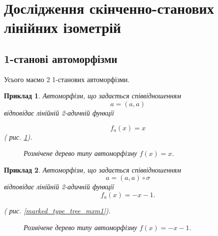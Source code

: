 \documentclass[a4paper,12pt]{article} \usepackage{a4wide}
\numberwithin{equation}{subsection}
\newtheorem{example}{Приклад}[subsection]
\begin{document}
 \newpage
\section{Дослідження скінченно-станових лінійних ізометрій}
\subsection{1-станові автоморфізми}
Усього маємо 2 1-станових автоморфізми.
\begin{example}
Автоморфізм, що задається співвідношенням
$$a = (a,a)$$
відповідає лінійній 2-адичній функції

$$f_a(x) = x $$
( рис. \ref{marked_type_tree_x}).
\begin{figure}[h!]
\caption{Розмічене дерево типу автоморфізму $f(x)= x$.}
\label{marked_type_tree_x}
\end{figure}


\end{example}

\begin{example}
Автоморфізм, що задається співвідношенням
$$a = (a,a)\circ\sigma$$
відповідає лінійній 2-адичній функції
$$f_a(x) = -x-1 .$$

( рис. \ref{marked_type_tree_mxm1}).
\begin{figure}[h!]
\caption{Розмічене дерево типу автоморфізму $f(x)=-x-1$.}
\label{marked_type_tree__mxm1}
\end{figure}
\end{example}
\end{document}
